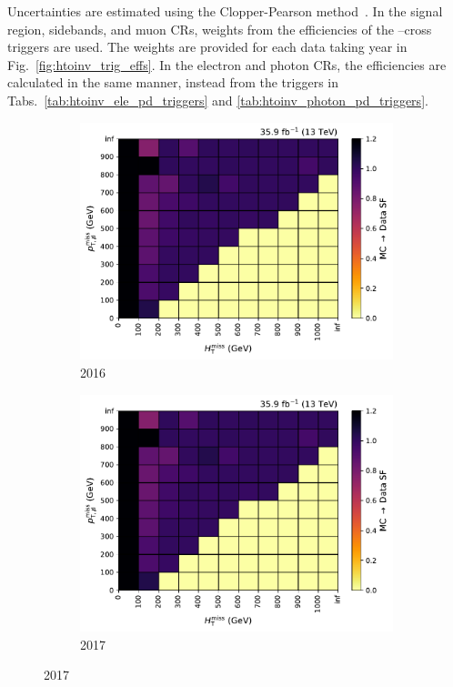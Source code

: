 Uncertainties are estimated using the Clopper-Pearson method~\cite{10.1093/biomet/26.4.404}. In the signal region, sidebands, and muon \glspl{CR}, weights from the efficiencies of the \ptmiss--\mht cross triggers are used. The weights are provided for each data taking year in Fig.~\ref{fig:htoinv_trig_effs}. In the electron and photon \glspl{CR}, the efficiencies are calculated in the same manner, instead from the triggers in Tabs.~\ref{tab:htoinv_ele_pd_triggers} and \ref{tab:htoinv_photon_pd_triggers}.

\begin{figure}[htbp]
    \centering
    \begin{subfigure}[b]{0.48\textwidth}
        \includegraphics[width=\textwidth]{figures/trigger_efficiencies/2016/SFs.pdf}
        \caption{2016}
    \end{subfigure}
    \hfill
    \begin{subfigure}[b]{0.48\textwidth}
        \includegraphics[width=\textwidth]{figures/trigger_efficiencies/2016/SFs.pdf}
        \caption{2017}
    \end{subfigure}


\end{figure}
